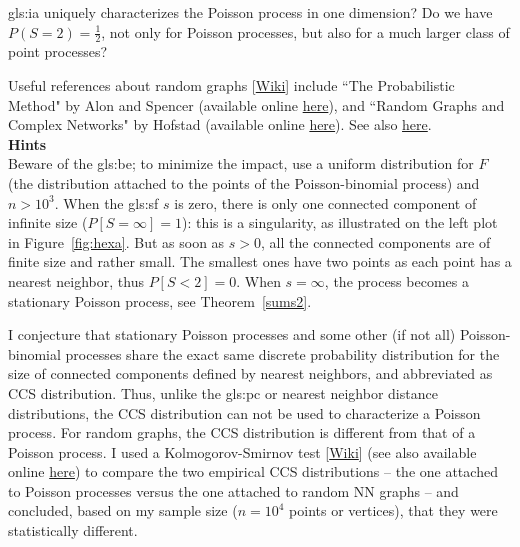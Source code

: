 \documentclass[10pt]{article}
\begin{document}
\begin{Exercise}
\begin{itemize}
\gls{gls:ia}
uniquely characterizes the Poisson process in one dimension? Do we have $P(S=2)=\frac{1}{2}$, not only for Poisson processes, but also for a much larger class of point processes?
\end{itemize}
 Useful references about random graphs [\href{https://en.wikipedia.org/wiki/Random_graph}{Wiki}] include ``The Probabilistic Method" by Alon and Spencer \cite{probme}
(available online \href{http://math.bme.hu/~gabor/oktatas/SztoM/AlonSpencer.ProbMethod3ed.pdf}{here}), and
``Random Graphs and Complex Networks" by Hofstad \cite{rvdh} (available online
 \href{https://www.win.tue.nl/~rhofstad/NotesRGCN.html}{here}). See also \href{https://math.stackexchange.com/questions/3883829/distribution-of-size-of-connected-components-in-erdos-renyi-random-graphs-in-the}{here}. \vspace{1ex}\\
{\bf Hints} \nopagebreak \vspace{1ex}\\
Beware of the \gls{gls:be}; to minimize the impact, use a uniform distribution for $F$ (the distribution attached to the points of the
Poisson-binomial process) and $n>10^3$. When the \gls{gls:sf} $s$ is zero, there is only one connected component of infinite size
($P[S=\infty]=1$): this is a singularity, as illustrated on the left plot in Figure~\ref{fig:hexa}. But as soon as $s>0$, all the connected components are of finite size
and rather small. The smallest ones have two points as each point has a nearest neighbor, thus $P[S<2]=0$. When $s=\infty$, the process becomes a stationary Poisson process,
see Theorem~\ref{sums2}.

I conjecture that stationary Poisson processes and some other (if not all) Poisson-binomial processes share the exact same discrete probability distribution for the size of connected components defined by nearest neighbors, and abbreviated as CCS distribution. Thus,
unlike the \gls{gls:pc} or
\textcolor{index}{nearest neighbor} distance distributions,
the CCS distribution can not be used to characterize a Poisson process. For random graphs, the CCS distribution is different from that of a Poisson process. I used a \textcolor{index}{Kolmogorov-Smirnov test}
[\href{https://en.wikipedia.org/wiki/Kolmogorov-Smirnov_test}{Wiki}] (see also \cite{kst} available online \href{https://projecteuclid.org/journals/annals-of-mathematical-statistics/volume-19/issue-2/On-the-Kolmogorov-Smirnov-Limit-Theorems-for-Empirical-Distributions/10.1214/aoms/1177730243.full}{here}) to compare the two empirical CCS distributions  -- the one attached to Poisson processes versus the one attached to random NN graphs --  and concluded, based on my sample size ($n=10^4$ points or vertices), that they were statistically different.


\end{Exercise}
\end{document}

